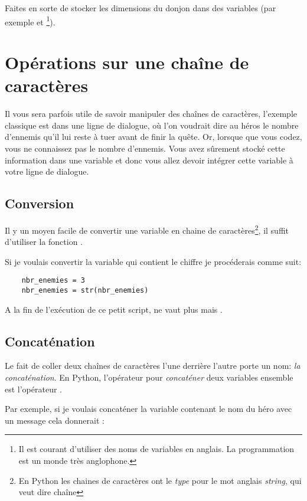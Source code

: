 Faites en sorte de stocker les dimensions du donjon dans des variables (par exemple  et \footnote{Il est courant d'utiliser des noms de variables en anglais. La programmation est un monde très anglophone.}).

\section{Opérations sur une chaîne de caractères}

Il vous sera parfois utile de savoir manipuler des chaînes de caractères, l'exemple classique est dans une ligne de dialogue, où l'on voudrait dire au héros le nombre d'ennemis qu'il lui reste à tuer avant de finir la quête. Or, lorsque que vous codez, vous ne connaissez pas le nombre d'ennemis. Vous avez sûrement stocké cette information dans une variable et donc vous allez devoir intégrer cette variable à votre ligne de dialogue.

\subsection{Conversion}
Il y un moyen facile de convertir une variable en chaine de caractères\footnote{En Python les chaines de caractères ont le \emph{type}  pour le mot anglais \textit{string}, qui veut dire chaîne}, il suffit d'utiliser la fonction .

Si je voulais convertir la variable  qui contient le chiffre  je procéderais comme suit:

\begin{lstlisting}
	nbr_enemies = 3
	nbr_enemies = str(nbr_enemies)
\end{lstlisting}

A la fin de l'exécution de ce petit script,  ne vaut plus  mais .

\subsection{Concaténation}
Le fait de coller deux chaînes de caractères l'une derrière l'autre porte un nom: \emph{la concaténation}.
En Python, l'opérateur pour \emph{concaténer} deux variables ensemble est l'opérateur \codeintext{+}.

Par exemple, si je voulais concaténer la variable contenant le nom du héro avec un message cela donnerait :
 
